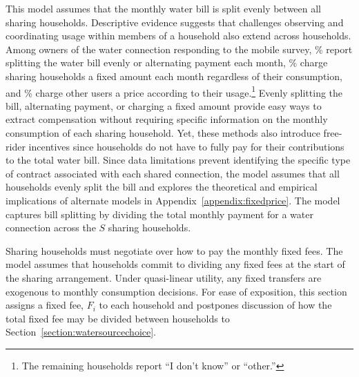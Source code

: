 \documentclass[12pt]{article}
\begin{document}
This model assumes that the monthly water bill is split evenly between all sharing households.  Descriptive evidence suggests that challenges observing and coordinating usage within members of a household also extend across households.  Among owners of the water connection responding to the mobile survey, \unskip\% report splitting the water bill evenly or alternating payment each month, \unskip\% charge sharing households a fixed amount each month regardless of their consumption, and \unskip\% charge other users a price according to their usage.\footnote{The remaining households report ``I don't know'' or ``other.''}  Evenly splitting the bill, alternating payment, or charging a fixed amount provide easy ways to extract compensation without requiring specific information on the monthly consumption of each sharing household.  Yet, these methods also introduce free-rider incentives since households do not have to fully pay for their contributions to the total water bill.  Since data limitations prevent identifying the specific type of contract associated with each shared connection, the model assumes that all households evenly split the bill and explores the theoretical and empirical implications of alternate models in Appendix~\ref{appendix:fixedprice}.  The model captures bill splitting by dividing the total monthly payment for a water connection across the $S$ sharing households.  


Sharing households must negotiate over how to pay the monthly fixed fees.  The model assumes that households commit to dividing any fixed fees at the start of the sharing arrangement.  Under quasi-linear utility, any fixed transfers are exogenous to monthly consumption decisions.  For ease of exposition, this section assigns a fixed fee, $F_i$ to each household and postpones discussion of how the total fixed fee may be divided between households to Section~\ref{section:watersourcechoice}.  
\end{document}
